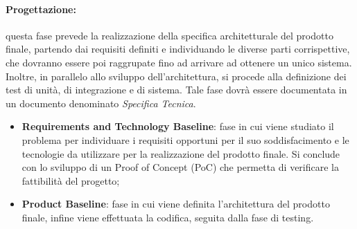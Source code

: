 \paragraph{Progettazione:} questa fase prevede la realizzazione della specifica architetturale del prodotto finale, partendo dai requisiti definiti e individuando le diverse parti corrispettive, che dovranno essere poi raggrupate fino ad arrivare ad ottenere un unico sistema. \newline
Inoltre, in parallelo allo sviluppo dell'architettura, si procede alla definizione dei test di unità, di integrazione e di sistema. \newline
Tale fase dovrà essere documentata in un documento denominato \textit{Specifica Tecnica}.

\begin{itemize}
    \item \textbf{Requirements and Technology Baseline}: fase in cui viene studiato il problema per individuare i requisiti opportuni per il suo soddisfacimento e le tecnologie da utilizzare per la realizzazione del prodotto finale. \newline
    Si conclude con lo sviluppo di un Proof of Concept (PoC) che permetta di verificare la fattibilità del progetto;
    \item \textbf{Product Baseline}: fase in cui viene definita l'architettura del prodotto finale, infine viene effettuata la codifica, seguita dalla fase di testing.
\end{itemize}

